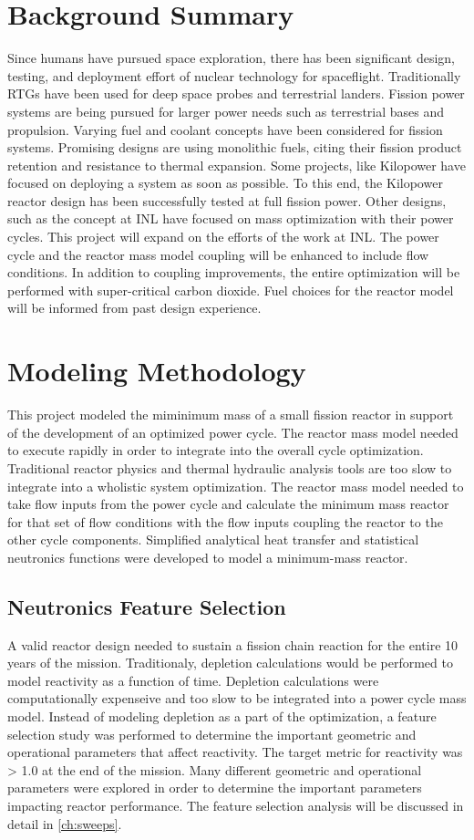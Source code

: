 \section{Background Summary}
Since humans have pursued space exploration, there has been significant design, 
testing, and deployment effort of nuclear technology for spaceflight. Traditionally
RTGs have been used for deep space probes and terrestrial landers. Fission power
systems are being pursued for larger power needs such as terrestrial bases and
propulsion. Varying fuel and coolant concepts have been considered for fission
systems. Promising designs are using monolithic fuels, citing their fission
product retention and resistance to thermal expansion. Some projects, like
Kilopower have focused on deploying a system as soon as possible. To this end,
the Kilopower reactor design has been successfully tested at full fission power.
Other designs, such as the concept at INL have focused on mass optimization with
their power cycles. This project will expand on the efforts of the work at INL.
The power cycle and the reactor mass model coupling will be enhanced to include
flow conditions. In addition to coupling improvements, the entire optimization
will be performed with super-critical carbon dioxide. Fuel choices for the
reactor model will be informed from past design experience.

\section{Modeling Methodology}
This project modeled the miminimum mass of a small fission reactor in support of
the development of an optimized power cycle. The reactor mass model needed to
execute rapidly in order to integrate into the overall cycle optimization.
Traditional reactor physics and thermal hydraulic analysis tools are too slow to
integrate into a wholistic system optimization. The reactor mass model needed to
take flow inputs from the power cycle and calculate the minimum mass reactor for
that set of flow conditions with the flow inputs coupling the reactor to 
the other cycle components. Simplified analytical heat transfer and
statistical neutronics functions were developed to model a minimum-mass reactor.

\subsection{Neutronics Feature Selection}
A valid reactor design needed to sustain a fission chain reaction for the entire
10 years of the mission. Traditionaly, depletion calculations would be performed
to model reactivity as a function of time. Depletion calculations were computationally expenseive and too slow to be
integrated into a power cycle mass model. Instead of modeling depletion as a
part of the optimization, a feature selection study was performed to determine
the important geometric and operational parameters that affect reactivity. The
target metric for reactivity was \keff > 1.0 at the end of the mission. Many different geometric and
operational parameters were explored in order to determine the important
parameters impacting reactor performance. The feature selection analysis will be
discussed in detail in \ref{ch:sweeps}.

